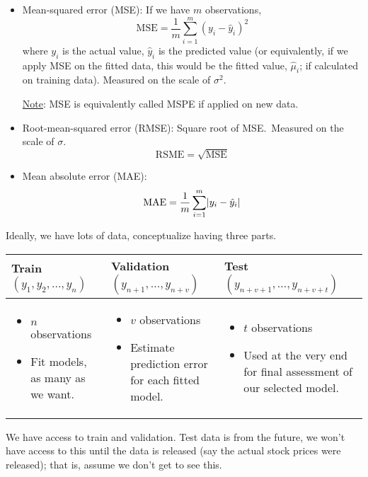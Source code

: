 \begin{itemize}
    \item Mean-squared error (MSE): If we have $ m $
          observations,
          \[ \text{MSE}=\frac{1}{m} \sum_{i=1}^{m} (y_i-\hat{y}_i)^2 \]
          where $ y_i $ is the actual value, $ \hat{y}_i $ is the
          predicted value (or equivalently, if we apply MSE on the fitted
          data, this would be the fitted value, $ \hat{\mu}_i $;
          if calculated on training data).
          Measured on the scale of $ \sigma^2 $.

          \underline{Note}: MSE is equivalently called MSPE
          if applied on new data.
    \item Root-mean-squared error (RMSE): Square root
          of MSE.\ Measured on the scale of $ \sigma $.
          \[ \text{RSME}=\sqrt{\text{MSE}} \]
    \item Mean absolute error (MAE):
          \[ \text{MAE}=\frac{1}{m} \sum_{i=1}^{m} \lvert y_i-\hat{y}_i\rvert \]
\end{itemize}
Ideally, we have lots of data, conceptualize having three parts.
\begin{table}[ht]
    \centering
    \begin{tabularx}{\linewidth}{@{}YYY@{}}
        \toprule
        Train $ (y_1,y_2,\ldots,y_n) $ & Validation $ (y_{n+1},\ldots,y_{n+v}) $ & Test $ (y_{n+v+1},\ldots,y_{n+v+t}) $ \\
        \midrule
        \begin{itemize}
            \item $ n $ observations
            \item Fit models, as many as we want.
        \end{itemize}
                                       &
        \begin{itemize}
            \item $ v $ observations
            \item Estimate prediction error
                  for each fitted model.
        \end{itemize}
                                       &
        \begin{itemize}
            \item $ t $ observations
            \item Used at the very end for final assessment
                  of our selected model.
        \end{itemize}                                                                                        \\
        \bottomrule
    \end{tabularx}
\end{table}
We have access to train and validation. Test data is from the future,
we won't have access to this until the data is released (say
the actual stock prices were released); that is, assume we don't get
to see this.

